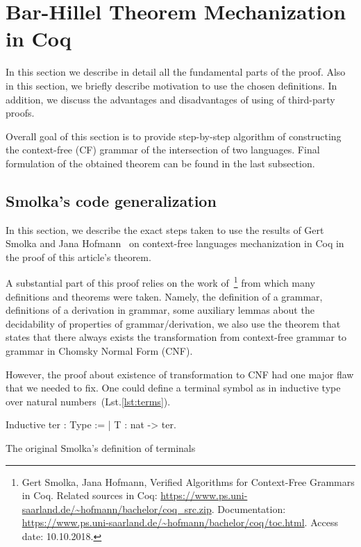 \section{Bar-Hillel Theorem Mechanization in Coq}
\label{sec:main}

In this section we describe in detail all the fundamental parts of the proof. 
Also in this section, we briefly describe motivation to use the chosen definitions. 
In addition, we discuss the advantages and disadvantages of using of third-party proofs. 

Overall goal of this section is to provide step-by-step algorithm of constructing the context-free (CF) grammar of the intersection of two languages.
Final formulation of the obtained theorem can be found in the last subsection. 
   
\subsection{ Smolka's code generalization}
\label{sec:solka-generalized}

In this section, we describe the exact steps taken to use the results of Gert Smolka and Jana Hofmann~\cite{smolkaHofmann2016} on context-free languages mechanization in Coq in the proof of this article's theorem.

A substantial part of this proof relies on the work of~\cite{smolkaHofmann2016}\footnote{Gert Smolka, Jana Hofmann, Verified Algorithms for Context-Free Grammars in Coq. Related sources in Coq: \url{https://www.ps.uni-saarland.de/~hofmann/bachelor/coq_src.zip}. Documentation: \url{https://www.ps.uni-saarland.de/~hofmann/bachelor/coq/toc.html}. Access date: 10.10.2018.} from which many definitions and theorems were taken. Namely, the definition of a grammar, definitions of a derivation in grammar, some auxiliary lemmas about the decidability of properties of grammar/derivation, we also use the theorem that states that there always exists the transformation from context-free grammar to grammar in Chomsky Normal Form (CNF).

However, the proof about existence of transformation to CNF had one major flaw that we needed to fix. One could define a terminal symbol as in inductive type over natural numbers~(Lst.\ref{lst:terms}).

\begin{listing}[h]
	\begin{pyglist}[language=coq, numbers=none, numbersep=5pt]
  Inductive ter : Type := | T : nat -> ter.
	\end{pyglist}
	\caption{The original Smolka's definition of terminals}
	\label{lst:terms}
\end{listing}

